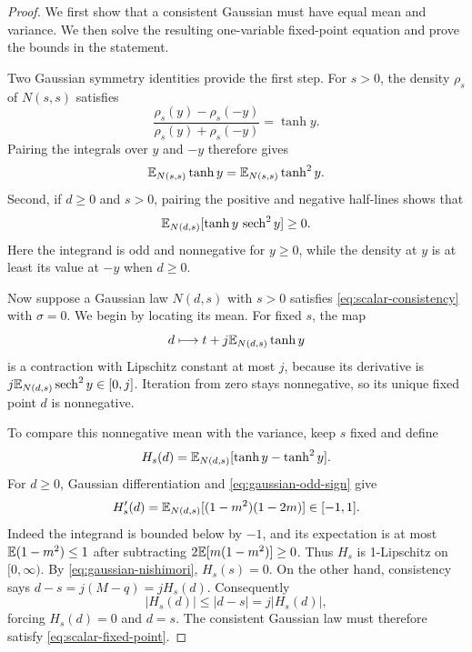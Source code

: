 \begin{proof}
We first show that a consistent Gaussian must have equal mean and
variance.  We then solve the resulting one-variable fixed-point
equation and prove the bounds in the statement.

Two Gaussian symmetry identities provide the first step.  For $s>0$,
the density $\rho_s$ of $N(s,s)$ satisfies
\[
 \frac{\rho_s(y)-\rho_s(-y)}{\rho_s(y)+\rho_s(-y)}=\tanh y.
\]
Pairing the integrals over $y$ and $-y$ therefore gives
\begin{equation}
 \mathbb E_{N(s,s)}\tanh y=\mathbb E_{N(s,s)}\tanh^2 y.
 \label{eq:gaussian-nishimori}
\end{equation}
Second, if $d\ge0$ and $s>0$, pairing the positive and negative
half-lines shows that
\begin{equation}
 \mathbb E_{N(d,s)}[\tanh y\,\operatorname{sech}^2 y]\ge0.
 \label{eq:gaussian-odd-sign}
\end{equation}
Here the integrand is odd and nonnegative for $y\ge0$, while the density
at $y$ is at least its value at $-y$ when $d\ge0$.

Now suppose a Gaussian law $N(d,s)$ with $s>0$ satisfies
\eqref{eq:scalar-consistency} with $\sigma=0$.  We begin by locating
its mean.  For fixed $s$, the map
\[
 d\longmapsto t+j\mathbb E_{N(d,s)}\tanh y
\]
is a contraction with Lipschitz constant at most $j$, because its
derivative is $j\mathbb E_{N(d,s)}\operatorname{sech}^2 y\in[0,j]$.  Iteration from zero
stays nonnegative, so its unique fixed point $d$ is nonnegative.

To compare this nonnegative mean with the variance, keep $s$ fixed
and define
\[
 H_s(d)=\mathbb E_{N(d,s)}[\tanh y-\tanh^2 y].
\]
For $d\ge0$, Gaussian differentiation and
\eqref{eq:gaussian-odd-sign} give
\[
 H_s'(d)=\mathbb E_{N(d,s)}[(1-m^2)(1-2m)]\in[-1,1].
\]
Indeed the integrand is bounded below by $-1$, and its expectation is
at most $\mathbb E(1-m^2)\le1$ after subtracting
$2\mathbb E[m(1-m^2)]\ge0$.  Thus $H_s$ is 1-Lipschitz on $[0,\infty)$.
By \eqref{eq:gaussian-nishimori}, $H_s(s)=0$.  On the other hand,
consistency says $d-s=j(M-q)=jH_s(d)$.  Consequently
\[
 |H_s(d)|\le |d-s|=j|H_s(d)|,
\]
forcing $H_s(d)=0$ and $d=s$.  The consistent Gaussian law must therefore
satisfy \eqref{eq:scalar-fixed-point}.


\end{proof}
